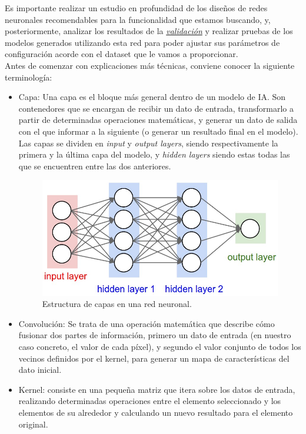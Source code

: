 \documentclass{article}
\begin{document}
Es importante realizar un estudio en profundidad de los diseños de redes neuronales recomendables para la funcionalidad que estamos buscando, y, posteriormente, analizar los resultados de la \hyperref[sec:terms]{\textit{validación}\tec} y realizar pruebas de los modelos generados utilizando esta red para poder ajustar sus parámetros de configuración acorde con el dataset que le vamos a proporcionar.\\

\noindent Antes de comenzar con explicaciones más técnicas, conviene conocer la siguiente terminología:
\begin{itemize}
	\item Capa: Una capa es el bloque más general dentro de un modelo de IA. Son contenedores que se encargan de recibir un dato de entrada, transformarlo a partir de determinadas operaciones matemáticas, y generar un dato de salida con el que informar a la siguiente (o generar un resultado final en el modelo). Las capas se dividen en \textit{input} y \textit{output layers}, siendo respectivamente la primera y la última capa del modelo, y \textit{hidden layers} siendo estas todas las que se encuentren entre las dos anteriores.
	\begin{figure}[!ht]
    	\centering
    	\label{fig:cnn}
    	\includegraphics[scale=0.25]{pics/cnn.jpg}
    	\caption{Estructura de capas en una red neuronal.}
	\end{figure}
	\item Convolución: Se trata de una operación matemática que describe cómo fusionar dos partes de información, primero un dato de entrada (en nuestro caso concreto, el valor de cada píxel), y segundo el valor conjunto de todos los vecinos definidos por el kernel, para generar un mapa de características del dato inicial.
	\item Kernel: consiste en una pequeña matriz que itera sobre los datos de entrada, realizando determinadas operaciones entre el elemento seleccionado y los elementos de su alrededor y calculando un nuevo resultado para el elemento original.

\end{itemize}
\end{document}
